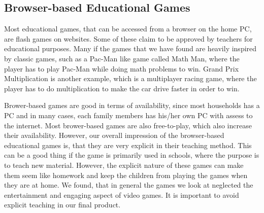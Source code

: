 \subsection{Browser-based Educational Games}
Most educational games, that can be accessed from a browser on the home PC, are flash games on websites. Some of these claim to be approved by teachers for educational purposes.
Many if the games that we have found are heavily inspired by classic games, such as a Pac-Man like game called Math Man, where the player has to play Pac-Man while doing math problems to win.\cite{mathman}
Grand Prix Multiplication is another example, which is a multiplayer racing game, where the player has to do multiplication to make the car drive faster in order to win.\cite{grandprix}\newline

Brower-based games are good in terms of availability, since most households has a PC and in many cases, each family members has his/her own PC with assess to the internet. Most brower-based games are also free-to-play, which also increase their availability. However, our overall impression of the browser-based educational games is, that they are very explicit in their teaching method. This can be a good thing if the game is primarily used in schools, where the purpose is to teach new material. However, the explicit nature of these games can make them seem like homework and keep the children from playing the games when they are at home. We found, that in general the games we look at neglected the entertainment and engaging aspect of video games. It is important to avoid explicit teaching in our final product.\newline


